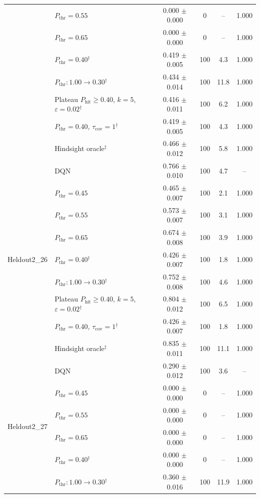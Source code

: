 \begin{table}[htbp]
\begin{tabular}{llcccc}
 & $P_{\mathrm{thr}}=0.55$ & 0.000 $\pm$ 0.000 & 0 & -- & 1.000 \\
 & $P_{\mathrm{thr}}=0.65$ & 0.000 $\pm$ 0.000 & 0 & -- & 1.000 \\
 & $P_{\mathrm{thr}}=0.40$$^{\dagger}$ & 0.419 $\pm$ 0.005 & 100 & 4.3 & 1.000 \\
 & $P_{\mathrm{thr}}: 1.00 \to 0.30$$^{\dagger}$ & 0.434 $\pm$ 0.014 & 100 & 11.8 & 1.000 \\
 & Plateau $P_{\mathrm{hit}}\geq0.40$, $k=5$, $\varepsilon=0.02$$^{\dagger}$ & 0.416 $\pm$ 0.011 & 100 & 6.2 & 1.000 \\
 & $P_{\mathrm{thr}}=0.40$, $\tau_{\mathrm{cov}}=1$$^{\dagger}$ & 0.419 $\pm$ 0.005 & 100 & 4.3 & 1.000 \\
 & Hindsight oracle$^{\ddagger}$ & 0.466 $\pm$ 0.012 & 100 & 5.8 & 1.000 \\
\midrule
\multirow{9}{*}{Heldout2\_26} & DQN & 0.766 $\pm$ 0.010 & 100 & 4.7 & -- \\
 & $P_{\mathrm{thr}}=0.45$ & 0.465 $\pm$ 0.007 & 100 & 2.1 & 1.000 \\
 & $P_{\mathrm{thr}}=0.55$ & 0.573 $\pm$ 0.007 & 100 & 3.1 & 1.000 \\
 & $P_{\mathrm{thr}}=0.65$ & 0.674 $\pm$ 0.008 & 100 & 3.9 & 1.000 \\
 & $P_{\mathrm{thr}}=0.40$$^{\dagger}$ & 0.426 $\pm$ 0.007 & 100 & 1.8 & 1.000 \\
 & $P_{\mathrm{thr}}: 1.00 \to 0.30$$^{\dagger}$ & 0.752 $\pm$ 0.008 & 100 & 4.6 & 1.000 \\
 & Plateau $P_{\mathrm{hit}}\geq0.40$, $k=5$, $\varepsilon=0.02$$^{\dagger}$ & 0.804 $\pm$ 0.012 & 100 & 6.5 & 1.000 \\
 & $P_{\mathrm{thr}}=0.40$, $\tau_{\mathrm{cov}}=1$$^{\dagger}$ & 0.426 $\pm$ 0.007 & 100 & 1.8 & 1.000 \\
 & Hindsight oracle$^{\ddagger}$ & 0.835 $\pm$ 0.011 & 100 & 11.1 & 1.000 \\
\midrule
\multirow{9}{*}{Heldout2\_27} & DQN & 0.290 $\pm$ 0.012 & 100 & 3.6 & -- \\
 & $P_{\mathrm{thr}}=0.45$ & 0.000 $\pm$ 0.000 & 0 & -- & 1.000 \\
 & $P_{\mathrm{thr}}=0.55$ & 0.000 $\pm$ 0.000 & 0 & -- & 1.000 \\
 & $P_{\mathrm{thr}}=0.65$ & 0.000 $\pm$ 0.000 & 0 & -- & 1.000 \\
 & $P_{\mathrm{thr}}=0.40$$^{\dagger}$ & 0.000 $\pm$ 0.000 & 0 & -- & 1.000 \\
 & $P_{\mathrm{thr}}: 1.00 \to 0.30$$^{\dagger}$ & 0.360 $\pm$ 0.016 & 100 & 11.9 & 1.000 \\

\end{tabular}
\end{table}
